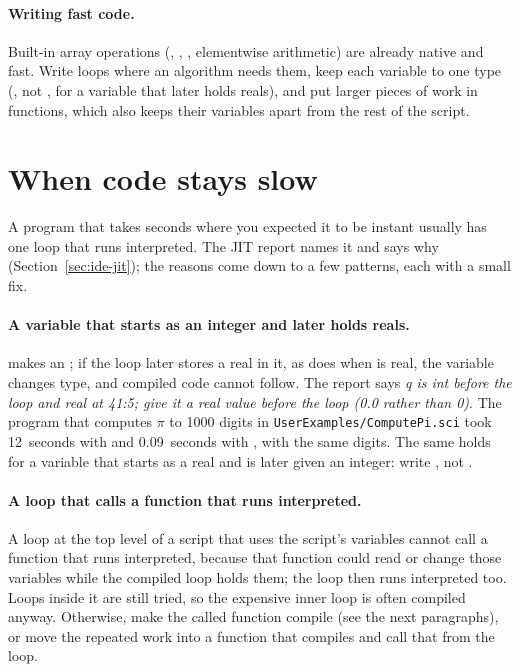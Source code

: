\documentclass[11pt,a4paper,openany]{report}
\begin{document}
{{\paragraph{Writing fast code.} Built-in array operations (,
, , elementwise arithmetic) are already native and fast.
Write loops where an algorithm needs them, keep each variable to one type
(, not , for a variable that later holds reals),
and put larger pieces of work in functions, which also keeps their variables
apart from the rest of the script.

\section{When code stays slow}\label{sec:slow}

A program that takes seconds where you expected it to be instant usually has
one loop that runs interpreted. The JIT report names it and says why
(Section~\ref{sec:ide-jit}); the reasons come down to a few patterns, each
with a small fix.

\paragraph{A variable that starts as an integer and later holds reals.}
 makes  an ; if the loop later stores a real in
it, as  does when  is real, the variable
changes type, and compiled code cannot follow. The report says
\emph{q is int before the loop and real at 41:5; give it a real value before
the loop (0.0 rather than 0)}. The program that computes $\pi$ to 1000
digits in \texttt{UserExamples/ComputePi.sci} took 12~seconds with
 and 0.09~seconds with , with the same digits.
The same holds for a variable that starts as a real and is later given an
integer: write , not .

\paragraph{A loop that calls a function that runs interpreted.} A loop at the
top level of a script that uses the script's variables cannot call a function
that runs interpreted, because that function could read or change those
variables while the compiled loop holds them; the loop then runs interpreted
too. Loops inside it are still tried, so the expensive inner loop is often
compiled anyway. Otherwise, make the called function compile (see the next
paragraphs), or move the repeated work into a function that compiles and
call that from the loop.

}}
\end{document}
